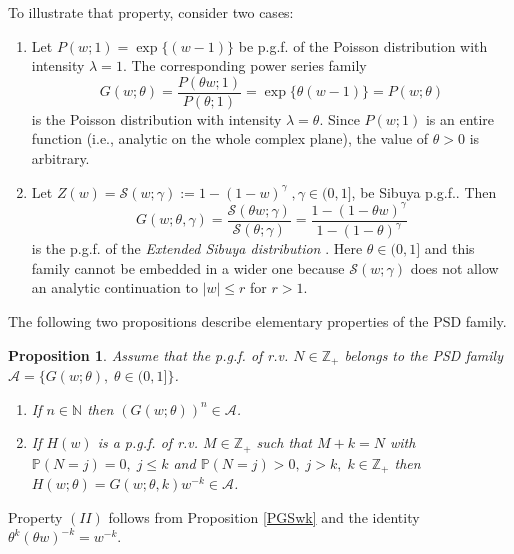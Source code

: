 \documentclass[a4paper,12pt]{amsart}
\newcommand{\N}{\mathbb{N}}
\newcommand{\Z}{\mathbb{Z}_{+}}
\newtheorem{Proposition}{Proposition}[section]
\theoremstyle{definition}
\theoremstyle{remark}
\begin{document}
To illustrate that property, consider two cases:
\begin{enumerate}[label=(\roman*), leftmargin=*]
\item Let $P(w; 1) = \exp\{(w-1)\}$ be p.g.f. of the Poisson distribution with intensity $\lambda =1$. The corresponding power series family 
\begin{equation} \label{poispgf}
G(w;\theta) =\frac{P(\theta w;1)}{P(\theta;1)}=\exp\{\theta (w-1)\}  =P(w;\theta) 
\end{equation}
is the Poisson distribution with intensity $\lambda=\theta$. Since $P(w;1)$ is an entire function (i.e., analytic on the whole complex plane), the value of $\theta>0$ is arbitrary. 


\item\label{ExSib}
Let $Z(w)=\mathcal{S}(w;\gamma) := 1-(1-w)^{\gamma}\;,\gamma \in (0,1]$, be Sibuya p.g.f..
Then
\begin{equation}\label{exsbd_pgf}
G(w;\theta,\gamma)= \frac{\mathcal{S}(\theta w;\gamma)}{\mathcal{S}(\theta;\gamma)}=
\frac{1-(1-\theta w)^{\gamma}}{1-(1-\theta)^{\gamma}}
\end{equation}
is the p.g.f. of the {\it Extended Sibuya distribution} \cite{Klebanov2023-xj}.
Here $\theta \in (0,1]$ and this family cannot be embedded in a wider one because $\mathcal{S}(w;\gamma)$ does not allow an analytic continuation to $|w|\leq r$ for $r>1$. 

\end{enumerate}

The following two propositions describe elementary properties of the PSD family.
\begin{Proposition}
Assume that the p.g.f. of r.v. $N\in \Z $ belongs to the PSD family $\mathcal{A}=\{G(w;\theta), \; \theta \in (0,1]\}$.
\begin{enumerate}[leftmargin=1.2cm] \label{propPSD}

    \item If $n\in \N$ then $(G(w;\theta))^n\in \mathcal{A}$.
    \item If $H(w)$ is a p.g.f. of r.v. $M\in \Z $ such that $M+k=N$ with  $\mathbb{P}(N=j)=0,\; j\leq k$ and $\mathbb{P}(N=j)>0,\; j> k,\; k \in \Z $ then $H(w;\theta)=G(w;\theta,k) w^{-k}\in \mathcal{A}$. 
    \end{enumerate}
\end{Proposition}
Property $(II)$ follows from Proposition \ref{PGSwk} and the identity $\theta^k(\theta w)^{-k}=w^{-k}$. 
\end{document}
